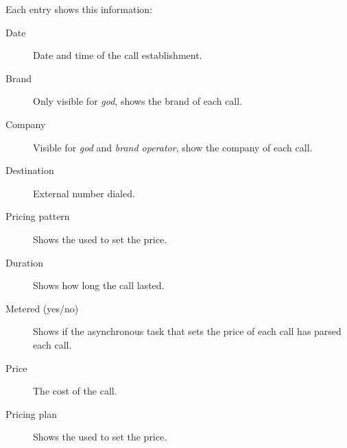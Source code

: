 \documentclass[letterpaper,10pt,english]{sphinxmanual}
\begin{document}
Each entry shows this information:
\begin{description}
\item[{Date}] \leavevmode{}\label{billing_and_invoices/billable_calls:term-date}
Date and time of the call establishment.

\item[{Brand}] \leavevmode{}\label{billing_and_invoices/billable_calls:term-brand}
Only visible for \emph{god}, shows the brand of each call.

\item[{Company}] \leavevmode{}\label{billing_and_invoices/billable_calls:term-company}
Visible for \emph{god} and \emph{brand operator}, show the company of each call.

\item[{Destination}] \leavevmode{}\label{billing_and_invoices/billable_calls:term-destination}
External number dialed.

\item[{Pricing pattern}] \leavevmode{}\label{billing_and_invoices/billable_calls:term-pricing-pattern}
Shows the {\hyperref[external_outgoing_calls/noplan_nocall:price\string-pattern]{}} used to set the price.

\item[{Duration}] \leavevmode{}\label{billing_and_invoices/billable_calls:term-duration}
Shows how long the call lasted.

\item[{Metered (yes/no)}] \leavevmode{}\label{billing_and_invoices/billable_calls:term-metered-yes-no}
Shows if the asynchronous task that sets the price of each call has
parsed each call.

\item[{Price}] \leavevmode{}\label{billing_and_invoices/billable_calls:term-price}
The cost of the call.

\item[{Pricing plan}] \leavevmode{}\label{billing_and_invoices/billable_calls:term-pricing-plan}
Shows the {\hyperref[external_outgoing_calls/noplan_nocall:price\string-plan]{}} used to set the price.


\end{description}
\end{document}
